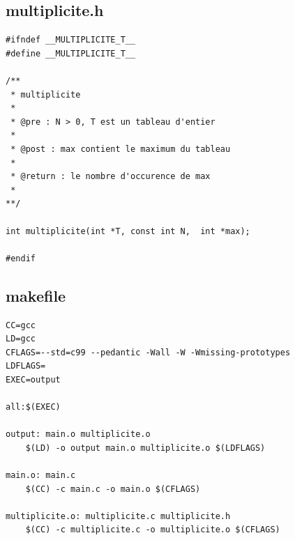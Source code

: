 \documentclass[a4paper, 11pt, oneside]{article}
\begin{document}
\subsection{multiplicite.h}

\begin{lstlisting}[caption={multiplicite.h}]
#ifndef __MULTIPLICITE_T__
#define __MULTIPLICITE_T__

/**
 * multiplicite
 * 
 * @pre : N > 0, T est un tableau d'entier
 * 
 * @post : max contient le maximum du tableau
 * 
 * @return : le nombre d'occurence de max
 * 
**/

int multiplicite(int *T, const int N,  int *max);

#endif
\end{lstlisting}


\subsection{makefile}

\begin{lstlisting}[caption={makefile}]
CC=gcc
LD=gcc
CFLAGS=--std=c99 --pedantic -Wall -W -Wmissing-prototypes
LDFLAGS=
EXEC=output

all:$(EXEC)

output: main.o multiplicite.o
	$(LD) -o output main.o multiplicite.o $(LDFLAGS)

main.o: main.c
	$(CC) -c main.c -o main.o $(CFLAGS)

multiplicite.o: multiplicite.c multiplicite.h
	$(CC) -c multiplicite.c -o multiplicite.o $(CFLAGS)
\end{lstlisting}
\end{document}
